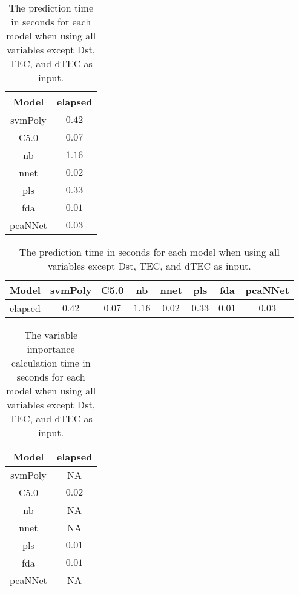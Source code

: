 \begin{table}[!ht]
	\centering
	\begin{tabular}{|c|c|}
		\hline
		Model & elapsed \\ \hline
		svmPoly & $0.42$ \\ \hline
		C5.0 & $0.07$ \\ \hline
		nb & $1.16$ \\ \hline
		nnet & $0.02$ \\ \hline
		pls & $0.33$ \\ \hline
		fda & $0.01$ \\ \hline
		pcaNNet & $0.03$ \\ \hline
	\end{tabular}
	\caption{The prediction time in seconds for each model when using all variables except Dst, TEC, and dTEC as input.}
	\label{tab:time:noTEC:predict}
\end{table}

\begin{table}[!ht]
	\centering
	\begin{tabular}{|c|c|c|c|c|c|c|c|}
		\hline
		Model & svmPoly & C5.0 & nb & nnet & pls & fda & pcaNNet \\ \hline
		elapsed & $0.42$ & $0.07$ & $1.16$ & $0.02$ & $0.33$ & $0.01$ & $0.03$ \\ \hline
	\end{tabular}
	\caption{The prediction time in seconds for each model when using all variables except Dst, TEC, and dTEC as input.}
	\label{tab:time:reverse:noTEC:predict}
\end{table}

\begin{table}[!ht]
	\centering
	\begin{tabular}{|c|c|}
		\hline
		Model & elapsed \\ \hline
		svmPoly & NA \\ \hline
		C5.0 & $0.02$ \\ \hline
		nb & NA \\ \hline
		nnet & NA \\ \hline
		pls & $0.01$ \\ \hline
		fda & $0.01$ \\ \hline
		pcaNNet & NA \\ \hline
	\end{tabular}
	\caption{The variable importance calculation time in seconds for each model when using all variables except Dst, TEC, and dTEC as input.}
	\label{tab:time:noTEC:importance}
\end{table}

